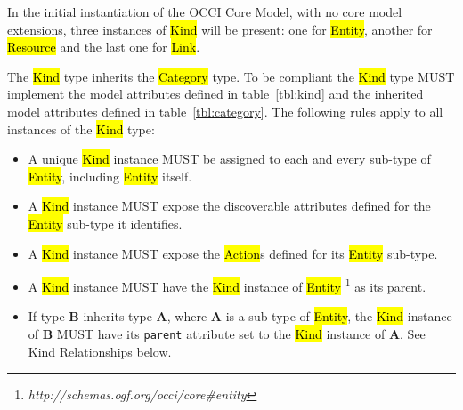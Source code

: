\documentclass[10pt,a4paper]{article}
\begin{document}
In the initial instantiation of the OCCI Core Model, with no core
model extensions, three instances of \hl{Kind} will be present: one
for \hl{Entity}, another for \hl{Resource} and the last one for
\hl{Link}.


The \hl{Kind} type inherits the \hl{Category} type. To be compliant
the \hl{Kind} type MUST implement the model attributes defined in
table~\ref{tbl:kind} and the inherited model attributes defined in
table~\ref{tbl:category}. The following rules apply to all instances
of the \hl{Kind} type:
%
\begin{itemize}
  \item A unique \hl{Kind} instance MUST be assigned to each and every
    sub-type of \hl{Entity}, including \hl{Entity} itself.

  \item A \hl{Kind} instance MUST expose the discoverable attributes defined for
    the \hl{Entity} sub-type it identifies.

  \item A \hl{Kind} instance MUST expose the \hl{Action}s defined for
    its \hl{Entity} sub-type.

  \item A \hl{Kind} instance MUST have the \hl{Kind} instance of \hl{Entity}%
    \footnote{\textit{http://schemas.ogf.org/occi/core\#entity}}
    as its parent.

  \item If type {\bf B} inherits type {\bf A}, where {\bf A} is a
    sub-type of \hl{Entity}, the \hl{Kind} instance of {\bf B} MUST
    have its {\tt parent} attribute set to the \hl{Kind} instance of {\bf A}.
    See Kind Relationships below.
\end{itemize}
\end{document}

